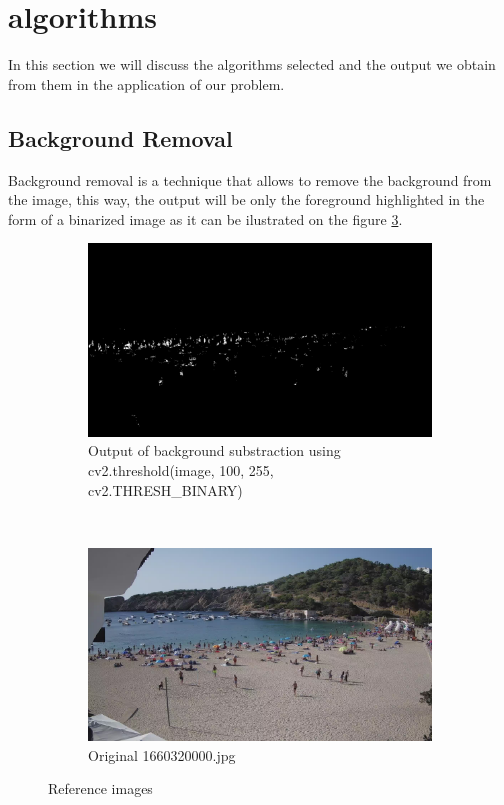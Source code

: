 \documentclass[10pt]{article}
\begin{document}
\section{algorithms}
In this section we will discuss the algorithms selected and the output we obtain from them in the application of our problem.

\subsection{Background Removal} 
Background removal is a technique that allows to remove the background from the image, this way, the output will be only the foreground highlighted in the form of a binarized image as it can be ilustrated on the figure \ref{fig: img_reference}. 

\begin{figure}[h]
    \begin{subfigure}[t]{0.5\textwidth}
        \centering
        \includegraphics[width=\textwidth]{img/bin_ex.jpg}
        \caption{Output of background substraction using cv2.threshold(image, 100, 255, cv2.THRESH\_BINARY)}
        \label{fig:y equals x}
    \end{subfigure}
    ~
    \begin{subfigure}[t]{0.5\textwidth}
        \centering
        \includegraphics[width=\textwidth]{img/or_ex.jpg}
        \caption{Original 1660320000.jpg}
        \label{fig:y equals x}
    \end{subfigure}

    \caption{Reference images}
    \label{fig: img_reference}
\end{figure}
\end{document}
